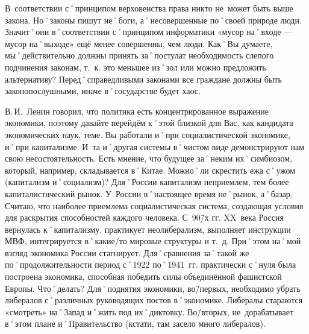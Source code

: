 \begin{drama}
	\pagebreak
	
	\maxspeaks В~соответствии с˚принципом верховенства права никто не~может быть выше закона. Но˚законы пишут не˚боги, а˚несовершенные по˚своей природе люди. Значит˚они в˚соответствии с˚принципом информатики  «мусор на˚входе — мусор на˚выходе» ещё менее совершенны, чем люди. Как˚Вы думаете, мы˚действительно должны принять за˚постулат необходимость слепого подчинения законам, т.~к. это меньшее из˚зол или можно предложить альтернативу?
	\michaelspeaks Перед˚справедливыми законами все граждане должны быть законопослушными, иначе в˚государстве будет хаос.

	\maxspeaks В.\,И.~Ленин говорил, что политика есть концентрированное выражение экономики, поэтому давайте перейдём к˚этой близкой для Вас, как кандидата экономических наук, теме. Вы работали и˚при социалистической экономике, и˚при капитализме. И~та и˚другая системы в˚чистом виде демонстрируют нам свою несостоятельность. Есть мнение, что будущее за˚неким их˚симбиозом, который, например, складывается в˚Китае. Можно˚ли скрестить ежа с˚ужом (капитализм и˚социализм)?
	\michaelspeaks Для˚России капитализм неприемлем, тем более капиталистический рынок. У~России в˚настоящее время не˚рынок, а˚базар. Считаю, что наиболее приемлема социалистическая система, создающая условия для раскрытия способностей каждого человека.
	\maxspeaks С~90\=/х гг. XX~века Россия вернулась к˚капитализму, практикует неолиберализм, выполняет инструкции МВФ, интегрируется в˚какие\=/то мировые структуры и т.~д. При˚этом на˚мой взгляд экономика России стагнирует. Для˚сравнения за˚такой же по˚продолжительности период с˚1922 по˚1941~гг. практически с˚нуля была построена экономика, способная победить силы объединённой фашистской Европы. Что˚делать? 
	\michaelspeaks Для˚поднятия экономики, во\=/первых, необходимо убрать либералов с˚различных руководящих постов в˚экономике. Либералы стараются «смотреть» на˚Запад и˚жить под их˚диктовку. Во\=/вторых, не~дорабатывает в˚этом плане и˚Правительство (кстати, там засело много либералов).


\end{drama}
